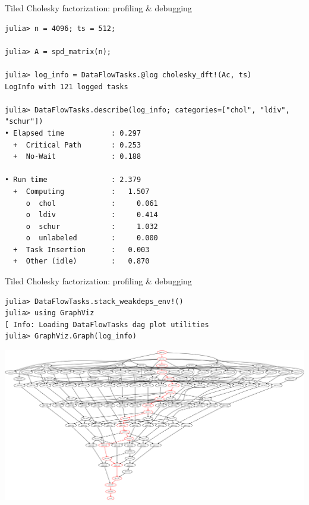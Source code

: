 \documentclass{beamer}
\begin{document}
\begin{frame}[fragile]{Tiled Cholesky factorization: profiling \& debugging}
  \begin{verbatim}
julia> n = 4096; ts = 512;
    
julia> A = spd_matrix(n);
    
julia> log_info = DataFlowTasks.@log cholesky_dft!(Ac, ts)
LogInfo with 121 logged tasks

julia> DataFlowTasks.describe(log_info; categories=["chol", "ldiv", "schur"])
• Elapsed time           : 0.297
  +  Critical Path       : 0.253
  +  No-Wait             : 0.188

• Run time               : 2.379
  +  Computing           :   1.507
     o  chol             :     0.061
     o  ldiv             :     0.414
     o  schur            :     1.032
     o  unlabeled        :     0.000
  +  Task Insertion      :   0.003
  +  Other (idle)        :   0.870
\end{verbatim}
\end{frame}

\begin{frame}[fragile]{Tiled Cholesky factorization: profiling \& debugging}
\begin{verbatim}
julia> DataFlowTasks.stack_weakdeps_env!()
julia> using GraphViz
[ Info: Loading DataFlowTasks dag plot utilities
julia> GraphViz.Graph(log_info)
\end{verbatim}
\includegraphics[width=\textwidth]{Cholesky_dag.png}
\end{frame}
\end{document}
